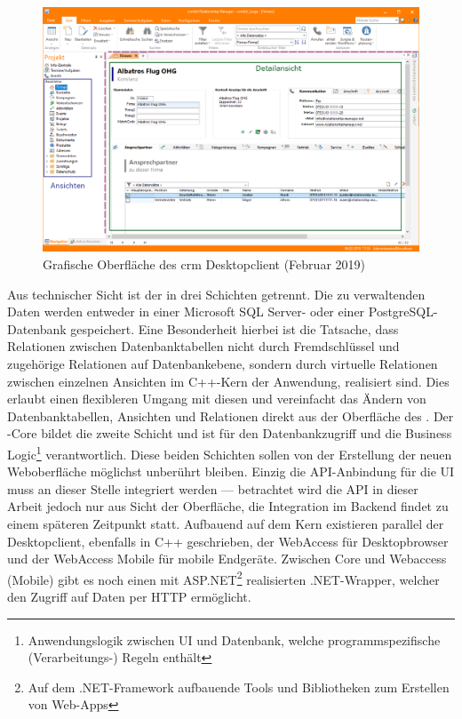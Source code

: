 \begin{figure}
    \centering
    \captionsetup{justification=centering}
    \includegraphics[width=\textwidth]{figures/crm_ui.png}
        \caption{Grafische Oberfläche des \gls{crm} Desktopclient (Februar 2019)}\label{fig:crm_ui}
\end{figure}

Aus technischer Sicht ist der  in drei Schichten getrennt. Die zu verwaltenden Daten werden entweder in einer Microsoft SQL Server- oder einer PostgreSQL-Datenbank gespeichert. Eine Besonderheit hierbei ist die Tatsache, dass Relationen zwischen Datenbanktabellen nicht durch Fremdschlüssel und zugehörige Relationen auf Datenbankebene, sondern durch virtuelle Relationen zwischen einzelnen Ansichten im C++-Kern der Anwendung, realisiert sind. Dies erlaubt einen flexibleren Umgang mit diesen und vereinfacht das Ändern von Datenbanktabellen, Ansichten und Relationen direkt aus der Oberfläche des .
Der -Core bildet die zweite Schicht und ist für den Datenbankzugriff und die Business Logic\footnote{Anwendungslogik zwischen UI und Datenbank, welche programmspezifische (Verarbeitungs-) Regeln enthält} verantwortlich. Diese beiden Schichten sollen von der Erstellung der neuen Weboberfläche möglichst unberührt bleiben. Einzig die API-Anbindung für die UI muss an dieser Stelle integriert werden --- betrachtet wird die API in dieser Arbeit jedoch nur aus Sicht der Oberfläche, die Integration im Backend findet zu einem späteren Zeitpunkt statt.
Aufbauend auf dem Kern existieren parallel der Desktopclient, ebenfalls in C++ geschrieben, der WebAccess für Desktopbrowser und der WebAccess Mobile für mobile Endgeräte. Zwischen Core und Webaccess (Mobile) gibt es noch einen mit ASP.NET\footnote{Auf dem .NET-Framework aufbauende Tools und Bibliotheken zum Erstellen von Web-Apps} realisierten .NET-Wrapper, welcher den Zugriff auf Daten per HTTP ermöglicht.

